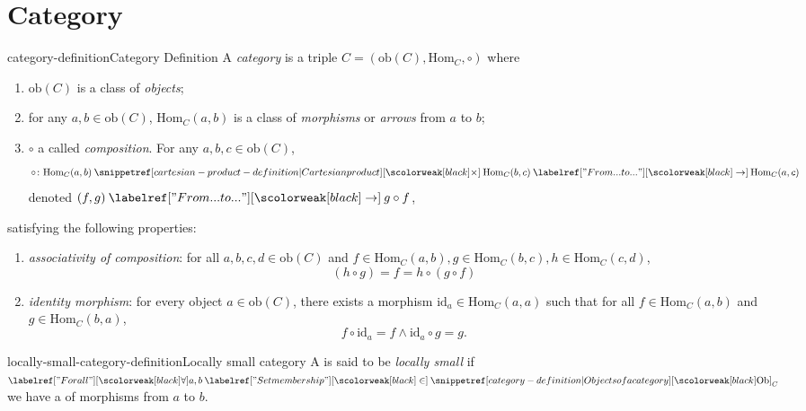 \documentclass[preview]{standalone}
\begin{document}
\genpage


\section{Category}

\begin{snippetdefinition}{category-definition}{Category Definition}
    A \emph{category} is a triple \(C=(\text{ob}(C), \text{Hom}_C, \circ)\) where
    \begin{enumerate}
        \item \(\text{ob}(C)\) is a class of \emph{objects};
        \item for any \(a,b\in\text{ob}(C)\), \(\text{Hom}_C(a,b)\) is a class of \emph{morphisms} or \emph{arrows}
        from \(a\) to \(b\);
        \item \(\circ\) a \binoperation called \emph{composition}.
        For any \(a,b,c\in \text{ob}(C)\),
        \[
            \circ \colon \text{Hom}_C(a,b) \cartesianprod \text{Hom}_C(b,c) \fromto \text{Hom}_C(a,c)
        \]
        denoted \((f,g) \fromto g \circ f\),
    \end{enumerate}
    satisfying the following properties:
    \begin{enumerate}
        \item \emph{associativity of composition}: for all
        \(a,b,c,d\in \text{ob}(C)\) and
        \(f \in \text{Hom}_C(a,b), g \in \text{Hom}_C(b,c), h \in \text{Hom}_C(c,d)\),
        \[
            (h \circ g) = f = h \circ (g \circ f)
        \]
        \item \emph{identity morphism}: for every object \(a\in \text{ob}(C)\),
        there exists a morphism \(\text{id}_a \in \text{Hom}_C(a,a)\) such that for all \(f \in \text{Hom}_C(a,b)\) and \(g \in \text{Hom}_C(b,a)\),
        \[
            f \circ \text{id}_a = f \land \text{id}_a \circ g = g.
        \]
    \end{enumerate}
\end{snippetdefinition}

\begin{snippetdefinition}{locally-small-category-definition}{Locally small category}
    A \category is said to be \emph{locally small}
    if \(\forall a,b \in \catob_C\) we have a \set of morphisms
    from \(a\) to \(b\).
\end{snippetdefinition}
\end{document}
